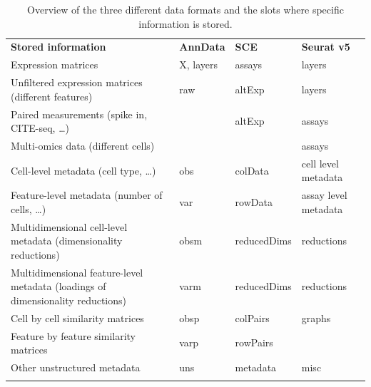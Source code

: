 \documentclass[unnumsec,webpdf,modern,large,namedate]{oup-authoring-template}%
\newcommand\mydots{\ifmmode\ldots\else\makebox[1em][c]{.\hfil.\hfil.}\fi}
\def\thickhline{\noalign{\hrule height.8pt}}
\begin{document}
\begin{table}[]
\small
\begin{tabular}{>{\raggedright}p{}
                 p{}
                 p{}
                 >{\raggedright\arraybackslash}p{}
                }
\thickhline
\textbf{Stored information} & \textbf{AnnData} & \textbf{SCE} & \textbf{Seurat v5} \\ \thickhline
Expression matrices & X, layers & assays & layers \\ \hline
Unfiltered expression matrices (different features) & raw & altExp & layers \\ \hline
Paired measurements (spike in, CITE-seq, \mydots) &  & altExp & assays \\ \hline
Multi-omics data (different cells) &  &  & assays \\ \hline
Cell-level metadata (cell type, \mydots) & obs & colData & cell level metadata \\ \hline
Feature-level metadata (number of cells, \mydots) & var & rowData & assay level metadata \\ \hline
Multidimensional cell-level metadata (dimensionality reductions) & obsm & reduced\-Dims & reductions \\ \hline
Multidimensional feature-level metadata (loadings of dimensionality reductions) & varm & reduced\-Dims & reductions \\ \hline
Cell by cell similarity matrices & obsp & colPairs & graphs \\ \hline
Feature by feature similarity matrices & varp & rowPairs &  \\ \hline
Other unstructured metadata & uns & metadata & misc \\ \thickhline
\end{tabular}
\caption{Overview of the three different data formats and the slots where specific information is stored.}
\label{tab:structure}
\end{table}
\end{document}
